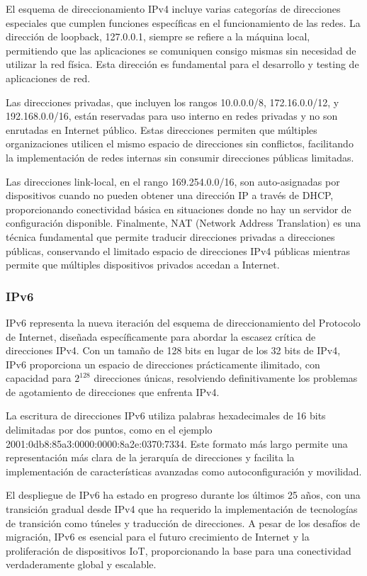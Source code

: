El esquema de direccionamiento IPv4 incluye varias categorías de direcciones especiales que cumplen funciones específicas en el funcionamiento de las redes. La dirección de loopback, 127.0.0.1, siempre se refiere a la máquina local, permitiendo que las aplicaciones se comuniquen consigo mismas sin necesidad de utilizar la red física. Esta dirección es fundamental para el desarrollo y testing de aplicaciones de red.

Las direcciones privadas, que incluyen los rangos 10.0.0.0/8, 172.16.0.0/12, y 192.168.0.0/16, están reservadas para uso interno en redes privadas y no son enrutadas en Internet público. Estas direcciones permiten que múltiples organizaciones utilicen el mismo espacio de direcciones sin conflictos, facilitando la implementación de redes internas sin consumir direcciones públicas limitadas.

Las direcciones link-local, en el rango 169.254.0.0/16, son auto-asignadas por dispositivos cuando no pueden obtener una dirección IP a través de DHCP, proporcionando conectividad básica en situaciones donde no hay un servidor de configuración disponible. Finalmente, NAT (Network Address Translation) es una técnica fundamental que permite traducir direcciones privadas a direcciones públicas, conservando el limitado espacio de direcciones IPv4 públicas mientras permite que múltiples dispositivos privados accedan a Internet.

\subsubsection{IPv6}

IPv6 representa la nueva iteración del esquema de direccionamiento del Protocolo de Internet, diseñada específicamente para abordar la escasez crítica de direcciones IPv4. Con un tamaño de 128 bits en lugar de los 32 bits de IPv4, IPv6 proporciona un espacio de direcciones prácticamente ilimitado, con capacidad para $2^{128}$ direcciones únicas, resolviendo definitivamente los problemas de agotamiento de direcciones que enfrenta IPv4.

La escritura de direcciones IPv6 utiliza palabras hexadecimales de 16 bits delimitadas por dos puntos, como en el ejemplo 2001:0db8:85a3:0000:0000:8a2e:0370:7334. Este formato más largo permite una representación más clara de la jerarquía de direcciones y facilita la implementación de características avanzadas como autoconfiguración y movilidad.

El despliegue de IPv6 ha estado en progreso durante los últimos 25 años, con una transición gradual desde IPv4 que ha requerido la implementación de tecnologías de transición como túneles y traducción de direcciones. A pesar de los desafíos de migración, IPv6 es esencial para el futuro crecimiento de Internet y la proliferación de dispositivos IoT, proporcionando la base para una conectividad verdaderamente global y escalable.

